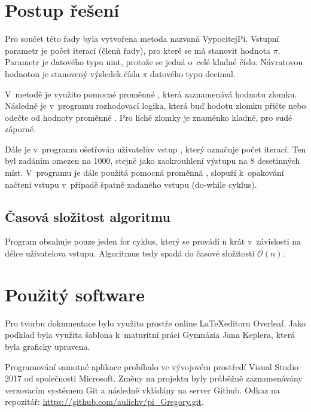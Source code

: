 \documentclass[11pt,a4paper]{report}
\begin{document}
	\section{Postup řešení}
	Pro součet této řady byla vytvořena metoda nazvaná VypocitejPi. Vstupní parametr je počet iterací (členů řady), pro které se má stanovit hodnota $\pi$. Parametr je datového typu uint, protože se jedná o~celé kladné číslo. Návratovou hodnotou je stanovený výsledek čísla $\pi$ datového typu decimal.
	
	V~metodě je využito pomocné proměnné , která zaznamenává hodnotu zlomku. Následně je v~programu rozhodovací logika, která buď hodotu zlomku přičte nebo odečte od hodnoty proměnné . Pro liché zlomky je znaménko kladné, pro sudé záporné. 
	
	Dále je v~programu ošetřován uživatelův vstup , který označuje počet iterací. Ten byl zadáním omezen na 1000, stejně jako zaokrouhlení výstupu na 8 desetinných míst. V~programu je dále použitá pomocná proměnná , slopuží k~opakování načtení vstupu v~případě špatně zadaného vstupu (do-while cyklus).
	
	\subsection{Časová složitost algoritmu}
	Program obsahuje pouze jeden for cyklus, který se provádí n krát v~závislosti na délce uživatelova vstupu. Algoritmus tedy spadá do časové složitosti $\mathcal{O}(n)$.
	
	\section{Použitý software}
	Pro tvorbu dokumentace bylo využito prostře online \LaTeX editoru Overleaf. Jako podklad byla využita šablona k~maturitní práci Gymnázia Jana Keplera, která byla graficky upravena.
	
	Programování samotné aplikace probíhalo ve vývojovém prostředí Visual Studio 2017 od společnosti Microsoft. Změny na projektu byly průběžně zaznamenávány verzovacím systémem Git a následně vkládány na server Github. Odkaz na repozitář: \url{https://github.com/aulichv/pi_Gregory.git}.
	
	\clearpage
\end{document}
